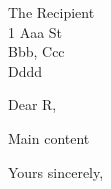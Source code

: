 \documentclass[ucl]{scrlttr2}
\begin{document}
\begin{letter}{%
    The Recipient\\
    1 Aaa St\\
    Bbb, Ccc\\
    Dddd
  }
  \opening{Dear R,}

  Main content

  \closing{Yours sincerely,}


\end{letter}
\end{document}

